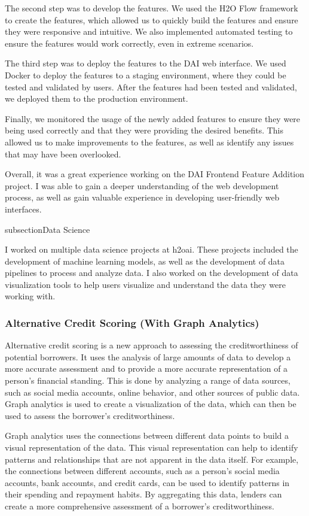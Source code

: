 \documentclass[12pt,a4paper]{report}
\begin{document}
The second step was to develop the features. We used the H2O Flow framework to create the features, which allowed us to quickly build the features and ensure they were responsive and intuitive. We also implemented automated testing to ensure the features would work correctly, even in extreme scenarios.

The third step was to deploy the features to the \ac{DAI} web interface. We used Docker to deploy the features to a staging environment, where they could be tested and validated by users. After the features had been tested and validated, we deployed them to the production environment.

Finally, we monitored the usage of the newly added features to ensure they were being used correctly and that they were providing the desired benefits. This allowed us to make improvements to the features, as well as identify any issues that may have been overlooked.

Overall, it was a great experience working on the \ac{DAI} Frontend Feature Addition project. I was able to gain a deeper understanding of the web development process, as well as gain valuable experience in developing user-friendly web interfaces.

subsection{Data Science}

I worked on multiple data science projects at h2oai. These projects included the development of machine learning models, as well as the development of data pipelines to process and analyze data. I also worked on the development of data visualization tools to help users visualize and understand the data they were working with.

\subsubsection*{Alternative Credit Scoring (With Graph Analytics)}

Alternative credit scoring is a new approach to assessing the creditworthiness of potential borrowers. It uses the analysis of large amounts of data to develop a more accurate assessment and to provide a more accurate representation of a person's financial standing. This is done by analyzing a range of data sources, such as social media accounts, online behavior, and other sources of public data. Graph analytics is used to create a visualization of the data, which can then be used to assess the borrower's creditworthiness.

Graph analytics uses the connections between different data points to build a visual representation of the data. This visual representation can help to identify patterns and relationships that are not apparent in the data itself. For example, the connections between different accounts, such as a person's social media accounts, bank accounts, and credit cards, can be used to identify patterns in their spending and repayment habits. By aggregating this data, lenders can create a more comprehensive assessment of a borrower's creditworthiness.
\end{document}
